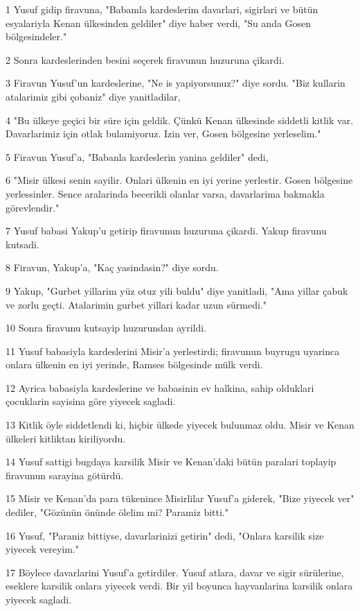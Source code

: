 \par 1 Yusuf gidip firavuna, "Babamla kardeslerim davarlari, sigirlari ve bütün esyalariyla Kenan ülkesinden geldiler" diye haber verdi, "Su anda Gosen bölgesindeler."
\par 2 Sonra kardeslerinden besini seçerek firavunun huzuruna çikardi.
\par 3 Firavun Yusuf'un kardeslerine, "Ne is yapiyorsunuz?" diye sordu. "Biz kullarin atalarimiz gibi çobaniz" diye yanitladilar,
\par 4 "Bu ülkeye geçici bir süre için geldik. Çünkü Kenan ülkesinde siddetli kitlik var. Davarlarimiz için otlak bulamiyoruz. Izin ver, Gosen bölgesine yerleselim."
\par 5 Firavun Yusuf'a, "Babanla kardeslerin yanina geldiler" dedi,
\par 6 "Misir ülkesi senin sayilir. Onlari ülkenin en iyi yerine yerlestir. Gosen bölgesine yerlessinler. Sence aralarinda becerikli olanlar varsa, davarlarima bakmakla görevlendir."
\par 7 Yusuf babasi Yakup'u getirip firavunun huzuruna çikardi. Yakup firavunu kutsadi.
\par 8 Firavun, Yakup'a, "Kaç yasindasin?" diye sordu.
\par 9 Yakup, "Gurbet yillarim yüz otuz yili buldu" diye yanitladi, "Ama yillar çabuk ve zorlu geçti. Atalarimin gurbet yillari kadar uzun sürmedi."
\par 10 Sonra firavunu kutsayip huzurundan ayrildi.
\par 11 Yusuf babasiyla kardeslerini Misir'a yerlestirdi; firavunun buyrugu uyarinca onlara ülkenin en iyi yerinde, Ramses bölgesinde mülk verdi.
\par 12 Ayrica babasiyla kardeslerine ve babasinin ev halkina, sahip olduklari çocuklarin sayisina göre yiyecek sagladi.
\par 13 Kitlik öyle siddetlendi ki, hiçbir ülkede yiyecek bulunmaz oldu. Misir ve Kenan ülkeleri kitliktan kiriliyordu.
\par 14 Yusuf sattigi bugdaya karsilik Misir ve Kenan'daki bütün paralari toplayip firavunun sarayina götürdü.
\par 15 Misir ve Kenan'da para tükenince Misirlilar Yusuf'a giderek, "Bize yiyecek ver" dediler, "Gözünün önünde ölelim mi? Paramiz bitti."
\par 16 Yusuf, "Paraniz bittiyse, davarlarinizi getirin" dedi, "Onlara karsilik size yiyecek vereyim."
\par 17 Böylece davarlarini Yusuf'a getirdiler. Yusuf atlara, davar ve sigir sürülerine, eseklere karsilik onlara yiyecek verdi. Bir yil boyunca hayvanlarina karsilik onlara yiyecek sagladi.
